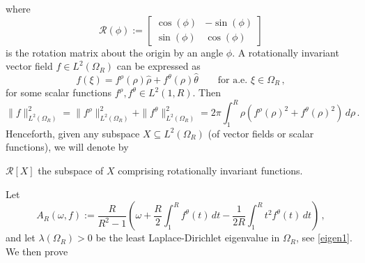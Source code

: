 \documentclass[a4paper,11pt]{article}
\numberwithin{equation}{section}
\numberwithin{figure}{section}
\begin{document}
where
\begin{equation} \label{rotmat}
\mathcal{R}(\phi) :=
\begin{bmatrix}
	\cos(\phi)       & -\sin(\phi)  \\[0.2cm]
	\sin(\phi)       & \cos(\phi)
\end{bmatrix}
\end{equation}
is the rotation matrix about the origin by an angle $\phi$. A rotationally invariant vector field $f \in L^2(\Omega_{R})$ can be expressed as
\begin{equation}\label{frotational}
f(\xi) = f^{\rho}(\rho) \widehat{\rho} + f^{\theta}(\rho) \widehat{\theta} \qquad \mbox{for a.e. }\xi\in\Omega_{R}\, ,
\end{equation}
for some scalar functions $f^{\rho}, f^{\theta}  \in L^2(1,R)$. Then
\begin{equation}\label{L2}
\|f\|_{L^2(\Omega_R)}^2=\|f^\rho\|_{L^2(\Omega_R)}^2+\|f^\theta\|_{L^2(\Omega_R)}^2=2\pi\int_1^{R} \rho
\left(f^\rho(\rho)^2+f^\theta(\rho)^2\right)\, d\rho\, .
\end{equation}
Henceforth, given any subspace $X \subseteq L^{2}(\Omega_{R})$ (of vector fields or scalar functions), we will denote by
\begin{center}
$\mathcal{R}[X]$ the
subspace of $X$ comprising rotationally invariant functions.
\end{center}
Let
$$
A_{R}(\omega,f) := \dfrac{R}{R^2 - 1} \left(\omega + \dfrac{R}{2}\int_{1}^{R} f^{\theta}(t)\, dt - \dfrac{1}{2R}\int_{1}^{R}
t^{2}f^{\theta}(t)\, dt \right) \,,
$$
and let $\lambda(\Omega_{R})>0$ be the least Laplace-Dirichlet eigenvalue in $\Omega_R$, see \eqref{eigen1}. We then prove
\end{document}
